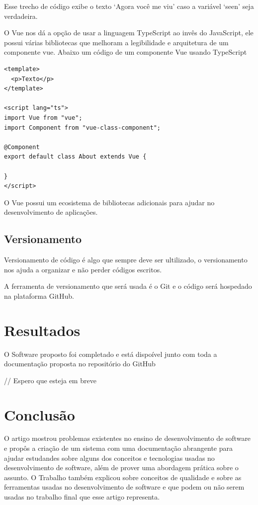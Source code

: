 \documentclass[12pt]{article}
\begin{document}
Esse trecho de código exibe o texto `Agora você me viu' caso a variável `seen' seja verdadeira.

O Vue nos dá a opção de usar a linguagem TypeScript ao invês do JavaScript, ele possui
várias bibliotecas que melhoram a legibilidade e arquitetura de um componente vue.
Abaixo um código de um componente Vue usando TypeScript

\begin{verbatim}
<template>
  <p>Texto</p>
</template>

<script lang="ts">
import Vue from "vue";
import Component from "vue-class-component";

@Component
export default class About extends Vue {

}
</script>
\end{verbatim}

O Vue possui um ecosistema de bibliotecas adicionais para ajudar no desenvolvimento de aplicações.

\subsection{Versionamento}

Versionamento de código é algo que sempre deve ser ultilizado, o versionamento nos ajuda a
organizar e não perder códigos escritos.

A ferramenta de versionamento que será usada é o Git e o código será hospedado na plataforma GitHub.

\section{Resultados}

O Software proposto foi completado e está dispoível junto com toda a documentação proposta no
repositório do GitHub

// Espero que esteja em breve

\section{Conclusão}

O artigo mostrou problemas existentes no ensino de desenvolvimento de software e propôs
a criação de um sistema com uma documentação abrangente para ajudar estudandes sobre alguns dos
conceitos e tecnologias usadas no desenvolvimento de software, além de prover uma abordagem prática
sobre o assunto. O Trabalho também explicou sobre conceitos de qualidade e sobre as ferramentas usadas
no desenvolvimento de software e que podem ou não serem usadas no trabalho final
que esse artigo representa.


\end{document}
